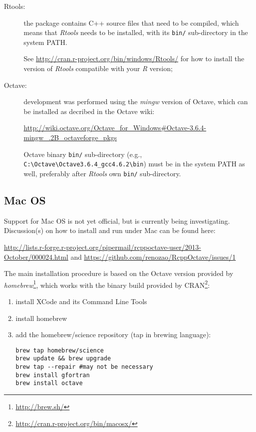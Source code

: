 \documentclass[english,10pt,a4paper]{article}\usepackage[]{graphicx}\usepackage[]{color}
\begin{document}
\begin{description}
  \item[Rtools:] the package contains C++ source files that need to be
  compiled, which means that \emph{Rtools} needs to be installed, with its
  \texttt{bin/} sub-directory in the system PATH.
  
  See \url{http://cran.r-project.org/bin/windows/Rtools/} for how to install the
  version of \emph{Rtools} compatible with your \emph{R} version;
  \item[Octave:] development was performed using the \emph{mingw} version of
  Octave, which can be installed as decribed in the Octave wiki:

\url{http://wiki.octave.org/Octave_for_Windows#Octave-3.6.4-mingw_.2B_octaveforge_pkgs}

  Octave binary \texttt{bin/} sub-directory (e.g.,
  \texttt{C:\textbackslash Octave\textbackslash Octave3.6.4\_gcc4.6.2\textbackslash bin}) must be in the system PATH as well, preferably after
  \emph{Rtools} own \texttt{bin/} sub-directory.
\end{description}

\subsection{Mac OS}
Support for Mac OS is not yet official, but is currently being investigating.
Discussion(s) on how to install and run under Mac can be found here:

\url{http://lists.r-forge.r-project.org/pipermail/rcppoctave-user/2013-October/000024.html}
and 
\url{https://github.com/renozao/RcppOctave/issues/1}

The main installation procedure is based on the Octave version provided by
\emph{homebrew}\footnote{\url{http://brew.sh/}}, which works with the binary
build provided by CRAN\footnote{\url{http://cran.r-project.org/bin/macosx/}}:

\begin{enumerate}
  \item install XCode and its Command Line Tools
  \item install homebrew
  \item add the homebrew/science repository (tap in brewing language):

\begin{verbatim}
brew tap homebrew/science
brew update && brew upgrade
brew tap --repair #may not be necessary
brew install gfortran
brew install octave
\end{verbatim}
\end{enumerate}
\end{document}
